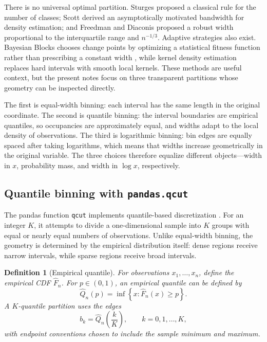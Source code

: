 \documentclass[12pt]{article}
\newtheorem{definition}{Definition}[section]
\numberwithin{equation}{section}
\begin{document}
There is no universal optimal partition. Sturges \cite{Sturges1926} proposed a classical rule for the number of classes; Scott \cite{Scott1979} derived an asymptotically motivated bandwidth for density estimation; and Freedman and Diaconis \cite{FreedmanDiaconis1981} proposed a robust width proportional to the interquartile range and $n^{-1/3}$. Adaptive strategies also exist. Bayesian Blocks chooses change points by optimizing a statistical fitness function rather than prescribing a constant width \cite{ScargleEtAl2013}, while kernel density estimation replaces hard intervals with smooth local kernels. These methods are useful context, but the present notes focus on three transparent partitions whose geometry can be inspected directly.

The first is equal-width binning: each interval has the same length in the original coordinate. The second is quantile binning: the interval boundaries are empirical quantiles, so occupancies are approximately equal, and widths adapt to the local density of observations. The third is logarithmic binning: bin edges are equally spaced after taking logarithms, which means that widths increase geometrically in the original variable. The three choices therefore equalize different objects---width in $x$, probability mass, and width in $\log x$, respectively.

\subsection{Quantile binning with \texttt{pandas.qcut}}

The pandas function \texttt{qcut} implements quantile-based discretization \cite{PandasQcut}. For an integer $K$, it attempts to divide a one-dimensional sample into $K$ groups with equal or nearly equal numbers of observations. Unlike equal-width binning, the geometry is determined by the empirical distribution itself: dense regions receive narrow intervals, while sparse regions receive broad intervals.

\begin{definition}[Empirical quantile]
For observations $x_1,\ldots,x_n$, define the empirical CDF $\widehat F_n$. For $p\in(0,1)$, an empirical quantile can be defined by
\begin{equation}
 \widehat Q_n(p)=\inf\left\{x:\widehat F_n(x)\geq p\right\}.
\end{equation}
A $K$-quantile partition uses the edges
\begin{equation}
 b_k=\widehat Q_n\left(\frac{k}{K}\right),
 \qquad k=0,1,\ldots,K,
\end{equation}
with endpoint conventions chosen to include the sample minimum and maximum.
\end{definition}
\end{document}
